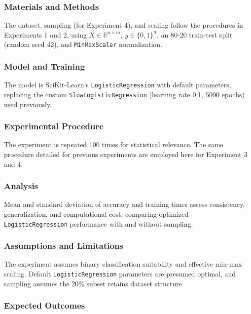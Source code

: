\documentclass{article}
\theoremstyle{plain}
\theoremstyle{definition}
\theoremstyle{remark}
\begin{document}
\subsubsection{Materials and Methods}

The dataset, sampling (for Experiment 4), and scaling follow the procedures in Experiments 1 and 2, using $ X \in \mathbb{R}^{n \times m} $, $ y \in \{0, 1\}^n $, an 80-20 train-test split (random seed 42), and \texttt{MinMaxScaler} normalization.

\subsubsection{Model and Training}

The model is SciKit-Learn's \texttt{LogisticRegression} with default parameters, replacing the custom \texttt{SlowLogisticRegression} (learning rate 0.1, 5000 epochs) used previously.

\subsubsection{Experimental Procedure}

The experiment is repeated 100 times for statistical relevance. The same procedure detailed for previous experiments are employed here for Experiment 3 and 4.

\subsubsection{Analysis}

Mean and standard deviation of accuracy and training times assess consistency, generalization, and computational cost, comparing optimized \texttt{LogisticRegression} performance with and without sampling.

\subsubsection{Assumptions and Limitations}

The experiment assumes binary classification suitability and effective min-max scaling. Default \texttt{LogisticRegression} parameters are presumed optimal, and sampling assumes the 20\% subset retains dataset structure.

\subsubsection{Expected Outcomes}
\end{document}
